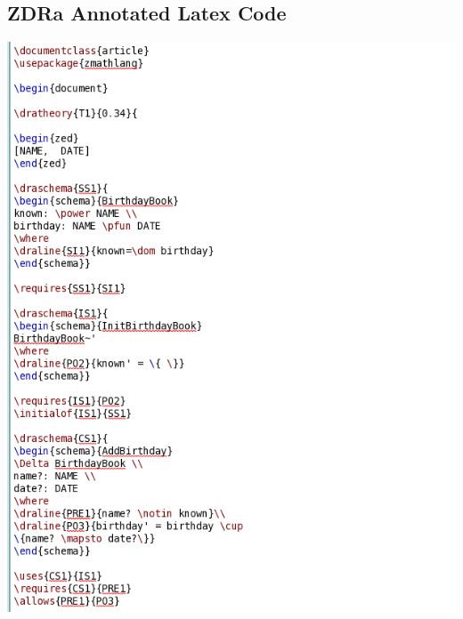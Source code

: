 \subsection{ZDRa Annotated Latex Code}
\label{app:bb2}
\includegraphics[scale=0.5]{examples/bb/2imagea.png}

